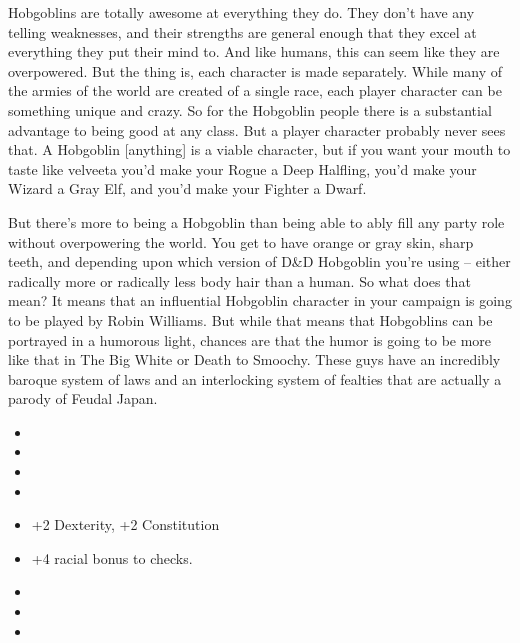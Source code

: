 \vspace*{-8pt}

Hobgoblins are totally awesome at everything they do. They don't have any telling weaknesses, and their strengths are general enough that they excel at everything they put their mind to. And like humans, this can seem like they are overpowered. But the thing is, each character is made separately. While many of the armies of the world are created of a single race, each player character can be something unique and crazy. So for the Hobgoblin people there is a substantial advantage to being good at any class. But a player character probably never sees that. A Hobgoblin [anything] is a viable character, but if you want your mouth to taste like velveeta you'd make your Rogue a Deep Halfling, you'd make your Wizard a Gray Elf, and you'd make your Fighter a Dwarf.

But there's more to being a Hobgoblin than being able to ably fill any party role without overpowering the world. You get to have orange or gray skin, sharp teeth, and depending upon which version of D\&D Hobgoblin you're using -- either radically more or radically less body hair than a human. So what does that mean? It means that an influential Hobgoblin character in your campaign is going to be played by Robin Williams. But while that means that Hobgoblins can be portrayed in a humorous light, chances are that the humor is going to be more like that in The Big White or Death to Smoochy. These guys have an incredibly baroque system of laws and an interlocking system of fealties that are actually a parody of Feudal Japan.

\begin{itemize}
\item {}
\item {}
\item {}
\item {}
\item +2 Dexterity, +2 Constitution
\item +4 racial bonus to  checks.
\item {}
\item {}
\item {}
\end{itemize}
